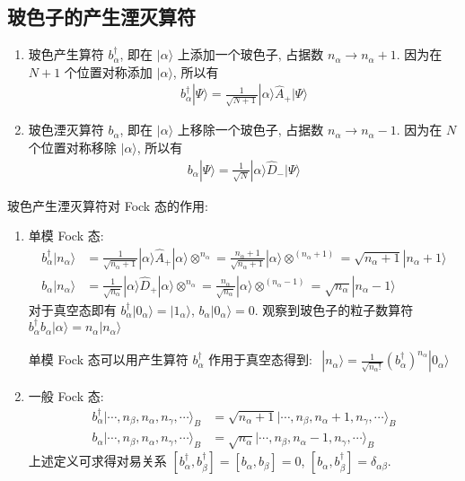 \documentclass[../../main.tex]{subfiles}
\begin{document}
\subsection{玻色子的产生湮灭算符}
\begin{enumerate}
  \item 玻色产生算符 $b_{\alpha}^{\dagger}$, 即在 $|\alpha\rangle$ 上添加一个玻色子, 占据数 $n_{\alpha}\rightarrow n_{\alpha} + 1$. 因为在 $N+1$ 个位置对称添加 $|\alpha\rangle$, 所以有
  \begin{align*}
    b_{\alpha}^{\dagger}|\Psi\rangle = \frac{1}{\sqrt{N+1}}|\alpha\rangle\hat{A}_{+}|\Psi\rangle
  \end{align*}
  \item 玻色湮灭算符 $b_{\alpha}$, 即在 $|\alpha\rangle$ 上移除一个玻色子, 占据数 $n_{\alpha}\rightarrow n_{\alpha} - 1$. 因为在 $N$ 个位置对称移除 $|\alpha\rangle$, 所以有
  \begin{align*}
    b_{\alpha}|\Psi\rangle = \frac{1}{\sqrt{N}}|\alpha\rangle\hat{D}_{-}|\Psi\rangle
  \end{align*}
\end{enumerate}
玻色产生湮灭算符对 Fock 态的作用:
\begin{enumerate}
  \item 单模 Fock 态:
  \begin{align*}
    b_{\alpha}^{\dagger}|n_{\alpha}\rangle 
    &= \frac{1}{\sqrt{n_{\alpha} + 1}}|\alpha\rangle\hat{A}_{+}|\alpha\rangle\otimes^{n_{\alpha}} 
    = \frac{n_{\alpha} + 1}{\sqrt{n_{\alpha} + 1}}|\alpha\rangle\otimes^{(n_{\alpha} + 1)} 
    = \sqrt{n_{\alpha} + 1}|n_{\alpha} + 1\rangle\\
    b_{\alpha}|n_{\alpha}\rangle 
    &= \frac{1}{\sqrt{n_{\alpha}}}|\alpha\rangle\hat{D}_{+}|\alpha\rangle\otimes^{n_{\alpha}} = \frac{n_{\alpha}}{\sqrt{n_{\alpha}}}|\alpha\rangle\otimes^{(n_{\alpha}-1)} = \sqrt{n_{\alpha}}|n_{\alpha}-1\rangle
  \end{align*}
  对于真空态即有 $b_{\alpha}^{\dagger}|0_{\alpha}\rangle = |1_{\alpha}\rangle$, $b_{\alpha}|0_{\alpha}\rangle = 0$. 
  观察到玻色子的粒子数算符 $b_{\alpha}^{\dagger}b_{\alpha}|\alpha\rangle = n_{\alpha}|n_{\alpha}\rangle$
  
  单模 Fock 态可以用产生算符 $b_{\alpha}^{\dagger}$ 作用于真空态得到: $\begin{aligned}
    |n_{\alpha}\rangle = \frac{1}{\sqrt{n_{\alpha}!}}\left(b_{\alpha}^{\dagger}\right)^{n_{\alpha}}|0_{\alpha}\rangle
  \end{aligned}$
  \item 一般 Fock 态: 
  \begin{align*}
    b_{\alpha}^{\dagger}|\cdots,n_{\beta},n_{\alpha},n_{\gamma},\cdots\rangle_{B} &= \sqrt{n_{\alpha} + 1}|\cdots,n_{\beta},n_{\alpha}+1,n_{\gamma},\cdots\rangle_{B}\\
    b_{\alpha}|\cdots,n_{\beta},n_{\alpha},n_{\gamma},\cdots\rangle_{B} &= \sqrt{n_{\alpha}}|\cdots,n_{\beta},n_{\alpha}-1,n_{\gamma},\cdots\rangle_{B}
  \end{align*}
  上述定义可求得对易关系 $\left[b_{\alpha}^{\dagger},b_{\beta}^{\dagger}\right] = \left[b_{\alpha},b_{\beta}\right] = 0$, $\left[b_{\alpha},b_{\beta}^{\dagger}\right] = \delta_{\alpha\beta}$. 
\end{enumerate}
\end{document}
